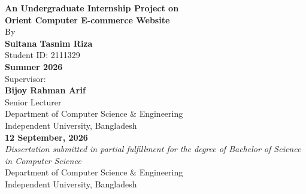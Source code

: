 \documentclass[12pt,a4paper,oneside]{report}
\newcommand{\projectTitle}{Orient Computer E-commerce Website}
\newcommand{\studentName}{Sultana Tasnim Riza}
\newcommand{\studentId}{2111329}
\newcommand{\academicSupervisor}{Bijoy Rahman Arif}
\newcommand{\academicSupervisorTitle}{Senior Lecturer}
\newcommand{\submissionSemester}{Summer 2026}
\newcommand{\submissionDate}{12 September, 2026}
\newcommand{\departmentName}{Department of Computer Science \& Engineering}
\newcommand{\universityName}{Independent University, Bangladesh}
\begin{document}

\begin{titlepage}
    \centering
    \vspace*{0.5cm}


    \vspace{1.2cm}
    {\Large \textbf{An Undergraduate Internship Project on}}\\[0.4cm]
    {\LARGE \textbf{\projectTitle}}\\[1.2cm]

    {\large By}\\[0.4cm]
    {\Large \textbf{\studentName}}\\[0.2cm]
    {\large Student ID: \studentId}\\[1.0cm]

    {\large \textbf{\submissionSemester}}\\[1.2cm]

    {\large Supervisor:}\\[0.2cm]
    {\large \textbf{\academicSupervisor}}\\[0.15cm]
    {\small \academicSupervisorTitle}\\[0.15cm]
    {\small \departmentName}\\[0.15cm]
    {\small \universityName}\\[1.2cm]

    {\large \textbf{\submissionDate}}\\[1.2cm]

    {\small \textit{Dissertation submitted in partial fulfillment for the degree of Bachelor of Science in Computer Science}}\\[0.4cm]
    {\small \departmentName}\\[0.15cm]
    {\small \universityName}

    \vfill
\end{titlepage}
\end{document}
